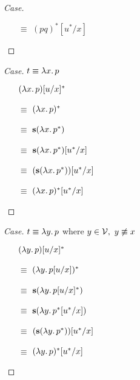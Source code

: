 \begin{prop}
\begin{proof}[Case]
\begin{itemize}
      \item[$\equiv$] $(pq)^*[u^*/x]$
          \marginnote{\Def-$(-)^*$}
          \qedhere
    \end{itemize}
  \end{proof}

  \begin{proof}[Case]
    $t\equiv\lambda x\ldotp p$
    \begin{itemize}
      \item[\phantom{$\equiv$}]
        $(\lambda x\ldotp p)[u/x]^*$

      \item[$\equiv$]
        $(\lambda x\ldotp p)^*$

      \item[$\equiv$]
        $\mathbf{s}(\lambda x\ldotp p^*)$
        \marginnote{\Def-$(-)^*$}

      \item[$\equiv$]
        $\mathbf{s}(\lambda x\ldotp p^*)[u^*/x]$

      \item[$\equiv$]
        $(\mathbf{s}(\lambda x\ldotp p^*))[u^*/x]$

      \item[$\equiv$]
        $(\lambda x\ldotp p)^*[u^*/x]$
        \marginnote{\Def-$(-)^*$}
        \qedhere
    \end{itemize}
  \end{proof}

  \begin{proof}[Case]
    $t\equiv\lambda y\ldotp p$ where $y\in\mathcal{V},~y\not\equiv x$
    \begin{itemize}
      \item[\phantom{$\equiv$}]
        $(\lambda y\ldotp p)[u/x]^*$

      \item[$\equiv$]
        $(\lambda y\ldotp p[u/x])^*$

      \item[$\equiv$]
        $\mathbf{s}(\lambda y\ldotp p[u/x]^*)$
        \marginnote{\Def-$(-)^*$}

      \item[$\equiv$]
        $\mathbf{s}(\lambda y\ldotp p^*[u^*/x])$

      \item[$\equiv$]
        $(\mathbf{s}(\lambda y\ldotp p^*))[u^*/x]$

      \item[$\equiv$]
        $(\lambda y\ldotp p)^*[u^*/x]$
        \marginnote{\Def-$(-)^*$}
        \qedhere
    \end{itemize}
  \end{proof}
\end{prop}

